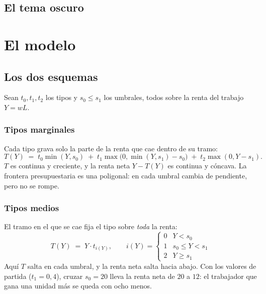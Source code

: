 \documentclass[11pt,a4paper]{appletmanual}
\begin{document}

\subsection{El tema oscuro}


\section{El modelo}

\subsection{Los dos esquemas}

Sean $t_0, t_1, t_2$ los tipos y $s_0 \le s_1$ los umbrales, todos sobre la
renta del trabajo $Y = wL$.

\subsubsection{Tipos marginales}

Cada tipo grava solo la parte de la renta que cae dentro de su tramo:
\[
  T(Y) \;=\; t_0\min(Y, s_0)
        \;+\; t_1\max\bigl(0, \min(Y, s_1) - s_0\bigr)
        \;+\; t_2\max(0, Y - s_1).
\]
$T$ es continua y creciente, y la renta neta $Y - T(Y)$ es continua y cóncava.
La frontera presupuestaria es una poligonal: en cada umbral cambia de
pendiente, pero no se rompe.

\subsubsection{Tipos medios}

El tramo en el que se cae fija el tipo sobre \emph{toda} la renta:
\[
  T(Y) \;=\; Y \cdot t_{i(Y)},
  \qquad
  i(Y) = \begin{cases} 0 & Y < s_0\\ 1 & s_0 \le Y < s_1\\ 2 & Y \ge s_1\end{cases}
\]
Aquí $T$ salta en cada umbral, y la renta neta salta hacia abajo. Con los
valores de partida ($t_1 = 0{,}4$), cruzar $s_0 = 20$ lleva la renta neta de
$20$ a $12$: el trabajador que gana una unidad más se queda con ocho menos.
\end{document}
